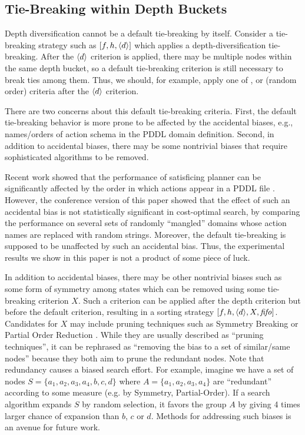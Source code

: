 \subsection{Tie-Breaking within Depth Buckets}

Depth diversification cannot be a default tie-breaking by itself.
Consider a tie-breaking strategy such as $[f,h,{\left<d\right>}]$ which applies a depth-diversification tie-breaking.
After the ${\left<d\right>}$ criterion is applied, 
there may be multiple nodes within the same depth bucket, so a
default tie-breaking criterion is still necessary to break ties among them.
Thus, we should, for example, apply one of \lifo, \fifo or \ro (random order) criteria
after the ${\left<d\right>}$ criterion.

There are two concerns about this default tie-breaking criteria.
First, the default tie-breaking behavior is more prone to be
affected by the accidental biases, e.g., names/orders of action schema in the PDDL domain definition.
Second, in addition to accidental biases, there may be some nontrivial biases that require 
sophisticated algorithms to be removed.

Recent work  showed that the performance of satisficing
planner can be significantly affected by the order in which actions appear in a PDDL file \cite{vallati2015effective}.
However, the conference version of this paper \cite{Asai2016} showed that
the effect of such an accidental bias is not statistically significant in cost-optimal search,
by comparing the performance on
several sets of randomly ``mangled'' domains whose action names are replaced with random strings.
Moreover, the \ro default tie-breaking is supposed to be unaffected by such an accidental bias.
Thus, the experimental results we show in this paper is not a product of some piece of luck.

In addition to accidental biases, there may be other nontrivial biases such as some form of symmetry among states which can be removed using some tie-breaking criterion $X$.
Such a criterion can be applied after the depth criterion but before the default criterion,
resulting in a sorting strategy $[f,h,{\left<d\right>},X,{\text{\textit{fifo}}}]$. 
Candidates for $X$ may
include pruning techniques such as Symmetry Breaking \cite{Fox1998,pochter2011exploiting,domshlak2013symmetry} or
Partial Order Reduction \cite{hall2013faster,wehrle2013relative}.
While they are usually described as ``pruning techniques'',
it can be rephrased as ``removing the bias to a set of similar/same nodes'' because
they both aim to prune the redundant nodes.
Note that redundancy causes a biased search effort. For example, imagine we have a
set of nodes $S=\{a_1, a_2, a_3, a_4, b, c, d\}$ where
$A=\{a_1, a_2, a_3, a_4\}$ are ``redundant'' according to some measure (e.g. by Symmetry,
Partial-Order). 
If a search algorithm expands $S$ by random selection, it favors the
group $A$ by giving 4 times larger chance of expansion than $b$,
$c$ or $d$.
Methods for addressing such biases is an avenue for future work.



